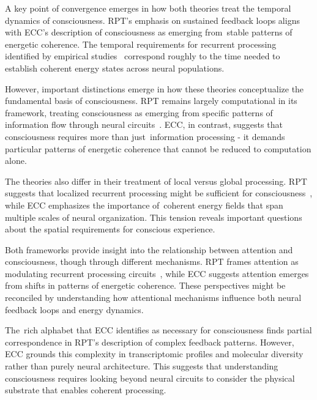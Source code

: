 A key point of convergence emerges in how both theories treat the temporal dynamics of consciousness. RPT's emphasis on sustained feedback loops aligns with ECC's description of consciousness as emerging from~stable patterns of energetic coherence. The temporal requirements for recurrent processing identified by empirical studies~\cite{Fahrenfort2007, Koivisto2010} correspond roughly to the time needed to establish coherent energy states across neural populations.

However, important distinctions emerge in how these theories conceptualize the fundamental basis of consciousness. RPT remains largely computational in its framework, treating consciousness as emerging from specific patterns of information flow through neural circuits~\cite{Dehaene2006, Dehaene2021}. ECC, in contrast, suggests that consciousness requires more than just~information processing - it demands particular patterns of energetic coherence that cannot be reduced to computation alone.

The theories also differ in their treatment of local versus global processing. RPT suggests that localized recurrent processing might be sufficient for consciousness~\cite{Super2001, Lamme2020}, while ECC emphasizes the importance of~coherent energy fields that span multiple scales of neural organization. This tension reveals important questions about the spatial requirements for conscious experience.

Both frameworks provide insight into the relationship between attention and consciousness, though through different mechanisms. RPT frames attention as modulating recurrent processing circuits~\cite{Block2007, Webb2016}, while ECC suggests attention emerges from shifts in patterns of energetic coherence. These perspectives might be reconciled by understanding how attentional mechanisms influence both neural feedback loops and energy dynamics.

The~rich alphabet that ECC identifies as necessary for consciousness finds partial correspondence in RPT's description of complex feedback patterns. However, ECC grounds this complexity in transcriptomic profiles and molecular diversity rather than purely neural architecture. This suggests that understanding consciousness requires looking beyond neural circuits to consider the physical substrate that enables coherent processing.

